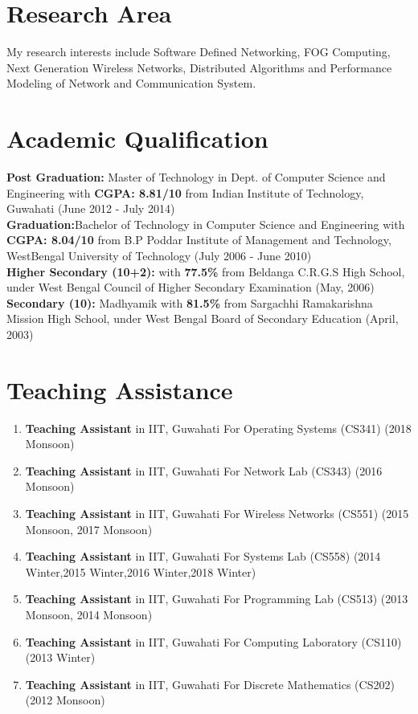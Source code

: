 \documentclass{article}
\begin{document}
\section{Research Area}    
 		My research interests include Software Defined Networking, FOG Computing, Next Generation Wireless Networks, Distributed Algorithms and Performance Modeling of Network and Communication System.
\section{Academic Qualification} 
	{\bf Post Graduation:} Master of Technology in Dept. of Computer Science and Engineering with {\bf CGPA: 8.81/10} from Indian Institute of Technology, Guwahati (June 2012 - July 2014)\\[3ex]
	{\bf Graduation:}Bachelor of Technology in Computer Science and Engineering with {\bf CGPA: 8.04/10} from B.P Poddar Institute of Management and Technology, WestBengal University of Technology (July 2006 - June 2010)\\[3ex]
	{\bf Higher Secondary (10+2):} with {\bf 77.5\%} from Beldanga C.R.G.S High School, under West Bengal Council of Higher Secondary Examination (May, 2006)\\[3ex]
	{\bf Secondary (10):} Madhyamik with {\bf 81.5\%} from Sargachhi Ramakarishna Mission High School, under West Bengal Board of Secondary Education (April, 2003)
\section{Teaching Assistance}	
	\begin{enumerate}
	 \item {\bf Teaching Assistant} in IIT, Guwahati For Operating Systems (CS341) (2018 Monsoon)
	 \item {\bf Teaching Assistant} in IIT, Guwahati For Network Lab (CS343) (2016 Monsoon)
	 \item {\bf Teaching Assistant} in IIT, Guwahati For Wireless Networks (CS551) (2015 Monsoon, 2017 Monsoon)
	 \item {\bf Teaching Assistant} in IIT, Guwahati For Systems Lab (CS558) (2014 Winter,2015 Winter,2016 Winter,2018 Winter)
	 \item {\bf Teaching Assistant} in IIT, Guwahati For Programming Lab (CS513) (2013 Monsoon, 2014 Monsoon)
	 \item {\bf Teaching Assistant} in IIT, Guwahati For Computing Laboratory (CS110) (2013 Winter)
	 \item {\bf Teaching Assistant} in IIT, Guwahati For Discrete Mathematics (CS202)  (2012 Monsoon)
	\end{enumerate}
\end{document}
